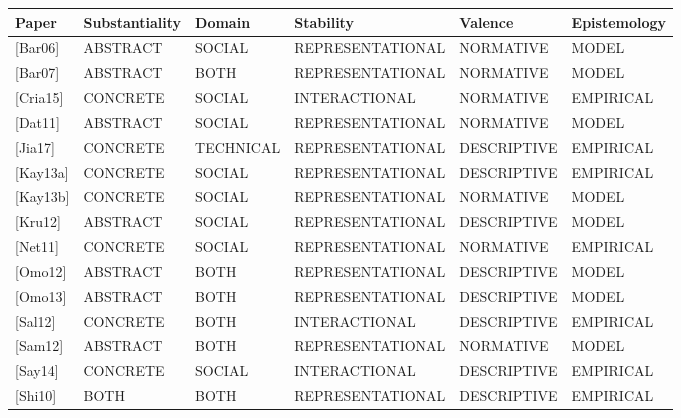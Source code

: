 \documentclass[../thesis.tex]{subfiles}
\begin{document}
\begin{flushleft}
\tablehead{}
\begin{supertabular}{|m{0.7025598in}|m{0.93095976in}|m{0.8170598in}|m{1.5045599in}|m{0.9316599in}|m{0.9212598in}|}
\hline
\textbf{Paper} &
\textbf{Substantiality} &
\textbf{Domain} &
\textbf{Stability} &
\textbf{Valence} &
\textbf{Epistemology}\\\hline
\textcolor[rgb]{0.2,0.2,0.2}{[Bar06]} &
ABSTRACT &
SOCIAL &
REPRESENTATIONAL &
NORMATIVE &
MODEL\\\hline
\textcolor[rgb]{0.2,0.2,0.2}{[Bar07]} &
ABSTRACT &
BOTH &
REPRESENTATIONAL &
NORMATIVE &
MODEL\\\hline
\textcolor[rgb]{0.2,0.2,0.2}{[Cria15]} &
CONCRETE &
SOCIAL &
INTERACTIONAL &
NORMATIVE &
EMPIRICAL\\\hline
\textcolor[rgb]{0.2,0.2,0.2}{[Dat11]} &
ABSTRACT &
SOCIAL &
REPRESENTATIONAL &
NORMATIVE &
MODEL\\\hline
\textcolor[rgb]{0.2,0.2,0.2}{[Jia17]} &
CONCRETE &
TECHNICAL &
REPRESENTATIONAL &
DESCRIPTIVE &
EMPIRICAL\\\hline
\textcolor[rgb]{0.2,0.2,0.2}{[Kay13a]} &
CONCRETE &
SOCIAL &
REPRESENTATIONAL &
DESCRIPTIVE &
EMPIRICAL\\\hline
\textcolor[rgb]{0.2,0.2,0.2}{[Kay13b]} &
CONCRETE &
SOCIAL &
REPRESENTATIONAL &
NORMATIVE &
MODEL\\\hline
\textcolor[rgb]{0.2,0.2,0.2}{[Kru12]} &
ABSTRACT &
SOCIAL &
REPRESENTATIONAL &
DESCRIPTIVE &
MODEL\\\hline
\textcolor[rgb]{0.2,0.2,0.2}{[Net11]} &
CONCRETE &
SOCIAL &
REPRESENTATIONAL &
NORMATIVE &
EMPIRICAL\\\hline
\textcolor[rgb]{0.2,0.2,0.2}{[Omo12]} &
ABSTRACT &
BOTH &
REPRESENTATIONAL &
DESCRIPTIVE &
MODEL\\\hline
\textcolor[rgb]{0.2,0.2,0.2}{[Omo13]} &
ABSTRACT &
BOTH &
REPRESENTATIONAL &
DESCRIPTIVE &
MODEL\\\hline
\textcolor[rgb]{0.2,0.2,0.2}{[Sal12]} &
CONCRETE &
BOTH &
INTERACTIONAL &
DESCRIPTIVE &
EMPIRICAL\\\hline
\textcolor[rgb]{0.2,0.2,0.2}{[Sam12]} &
ABSTRACT &
BOTH &
REPRESENTATIONAL &
NORMATIVE &
MODEL\\\hline
\textcolor[rgb]{0.2,0.2,0.2}{[Say14]} &
CONCRETE &
SOCIAL &
INTERACTIONAL &
DESCRIPTIVE &
EMPIRICAL\\\hline
\textcolor[rgb]{0.2,0.2,0.2}{[Shi10]} &
BOTH &
BOTH &
REPRESENTATIONAL &
DESCRIPTIVE &
EMPIRICAL\\\hline

\end{supertabular}
\end{flushleft}
\end{document}
